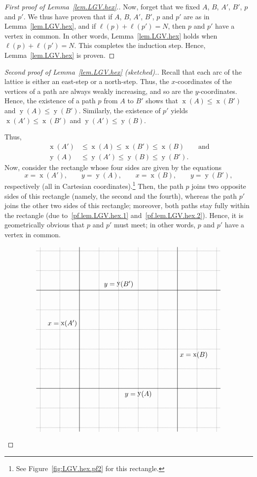 \documentclass[reqno]{amsart}
\newcommand{\0}{\phantom{c}}
\DeclareMathOperator{\xcoord}{x} %
\DeclareMathOperator{\ycoord}{y} %
\newenvironment{verlong}{}{}
\theoremstyle{plain}
\theoremstyle{definition}
\numberwithin{equation}{section}
\begin{document}
\begin{verlong}
\begin{proof}[First proof of Lemma~\ref{lem.LGV.hex}.]
Now, forget that we fixed $A$, $B$, $A'$, $B'$, $p$ and $p'$.
We thus have proven that if $A$, $B$, $A'$, $B'$, $p$ and $p'$ are as in Lemma~\ref{lem.LGV.hex}, and if $\ell(p) + \ell(p') = N$, then $p$ and $p'$ have a vertex in common.
In other words, Lemma~\ref{lem.LGV.hex} holds when $\ell(p) + \ell(p') = N$.
This completes the induction step.
Hence, Lemma~\ref{lem.LGV.hex} is proven.
\end{proof}

\begin{proof}[Second proof of Lemma~\ref{lem.LGV.hex} (sketched).]
Recall that each arc of the lattice is either an east-step or a north-step.
Thus, the $x$-coordinates of the vertices of a path are always weakly increasing, and so are the $y$-coordinates.
Hence, the existence of a path $p$ from $A$ to $B'$ shows that $\xcoord(A) \leq \xcoord(B')$ and $\ycoord(A) \leq \ycoord(B')$.
Similarly, the existence of $p'$ yields $\xcoord(A') \leq \xcoord(B')$ and $\ycoord(A') \leq\ycoord(B)$.

Thus,
\begin{align}
\xcoord(A')  & \leq \xcoord(A)  \leq \xcoord(B') \leq \xcoord(B) \qquad \text{and} \label{pf.lem.LGV.hex.1} \\
\ycoord(A)  & \leq \ycoord(A') \leq \ycoord(B) \leq \ycoord(B'). \label{pf.lem.LGV.hex.2}
\end{align}
Now, consider the rectangle whose four sides are given by the equations
\[
x = \xcoord(A'), \qquad
y = \ycoord(A), \qquad
x = \xcoord(B), \qquad
y = \ycoord(B'),
\]
respectively (all in Cartesian coordinates).\footnote{See Figure~\ref{fig:LGV.hex.pf2} for this rectangle.}
Then, the path $p$ joins two opposite sides of this rectangle (namely, the second and the fourth), whereas
the path $p'$ joins the other two sides of this rectangle; moreover, both paths stay fully within the rectangle (due to~\eqref{pf.lem.LGV.hex.1} and~\eqref{pf.lem.LGV.hex.2}).
Hence, it is geometrically obvious that $p$ and $p'$ must meet; in other words, $p$ and $p'$ have a vertex in common.

\begin{figure}[t]
\[
\begin{tikzpicture}
  \draw[densely dotted] (-1.2,-1.2) grid (8.2,8.2);
  
  \draw (1,-1.2) -- (1,8.2);
  \draw (1,4.3) node[anchor=east] {$x = \xcoord(A')$};
  \draw (-1.2,1) -- (8.2,1);
  \draw (4,1) node[anchor=north] {$y = \ycoord(A)$};
  \draw (6,-1.2) -- (6,8.2);
  \draw (6,2.7) node[anchor=west] {$x = \xcoord(B)$};
  \draw (-1.2,6) -- (8.2,6);
  \draw (3,6) node[anchor=south] {$y = \ycoord(B')$};
  

\end{tikzpicture}\]
\end{figure}
\end{proof}
\end{verlong}
\end{document}
